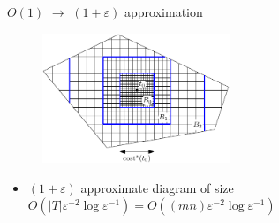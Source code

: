 \documentclass[xcolor={dvipsnames,usenames}]{beamer}
\newcommand{\eps}{\varepsilon}
\def\abs#1{\mathopen| #1 \mathclose|}		%
\begin{document}
\begin{frame}{$O(1)$ $\rightarrow$ $(1+\eps)$ approximation}
\begin{figure}
\begin{center}
\includegraphics[width=0.5\textwidth,page=1]{nested-grid-crop}%
\end{center}
\end{figure}
\begin{itemize}
\item $(1+\eps)$ approximate diagram of size
	$O(\abs{T}\eps^{-2}\log\eps^{-1}) = O((mn)\eps^{-2}\log\eps^{-1})$
\end{itemize}
\end{frame}
\end{document}
